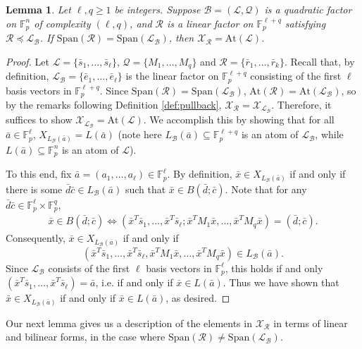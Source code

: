 \documentclass[12pt,oneside,british,a4wide]{amsart}
\newtheorem{lemma}[theorem]{Lemma}
\numberwithin{equation}{section}
\theoremstyle{definition}
\def\F{\mathbb{F}}
\newcommand{\abar}{\bar{a}}
\newcommand{\cbar}{\bar{c}}
\newcommand{\dbar}{\bar{d}}
\newcommand{\ebar}{\bar{e}}
\newcommand{\rbar}{\bar{r}}
\newcommand{\sbar}{\bar{s}}
\newcommand{\xbar}{\bar{x}}
\newcommand{\calL}{\mathcal{L}}
\newcommand{\calB}{\mathcal{B}}
\newcommand{\calQ}{\mathcal{Q}}
\newcommand{\calR}{\mathcal{R}}
\newcommand{\calX}{\mathcal{X}}
\newcommand{\Span}{{\mathrm{Span}}}
\newcommand{\At}{{\mathrm{At}}}
\begin{document}
\begin{lemma}\label{lem:pullback1}
Let $\ell,q\geq 1$ be integers. Suppose $\calB=(\calL,\calQ)$ is a quadratic factor on $\F_p^n$ of complexity $(\ell,q)$, and $\calR $ is a linear factor on $\F_p^{\ell+q}$ satisfying $\calR \preceq\calL_{\calB}$. If $\Span(\calR)=\Span(\calL_{\calB})$, then $\calX_{\calR}=\At(\calL)$.
\end{lemma}
\begin{proof}
Let $\calL=\{\sbar_1,\ldots, \sbar_{\ell}\}$, $\calQ=\{M_1,\ldots, M_q\}$ and $\calR=\{\rbar_1,\ldots, \rbar_k\}$.  Recall that, by definition, $\calL_{\calB}=\{\ebar_1,\ldots, \ebar_{\ell}\}$ is the linear factor on $\F_p^{\ell+q}$ consisting of the first $\ell$ basis vectors in $\F_p^{\ell+q}$.  Since  $\Span(\calR)=\Span(\calL_{\calB})$,  $\At(\calR)=\At(\calL_{\calB})$, so by the remarks following Definition \ref{def:pullback},  $\calX_{\calR}=\calX_{\calL_{\calB}}$.  Therefore, it suffices to show  $\calX_{\calL_{\calB}}=\At(\calL)$. We accomplish this by showing that for all $\abar\in \F_p^{\ell}$, $X_{L_{\calB}(\abar)}=L(\abar)$ (note here $L_{\calB}(\abar)\subseteq \F_p^{\ell+q}$ is an atom of $\calL_{\calB}$, while $L(\abar)\subseteq\F_p^n$ is an atom of $\calL$).

To this end, fix $\abar=(a_1,\ldots, a_{\ell})\in \mathbb{F}_p^{\ell}$. By definition, $\xbar\in X_{L_{\calB}(\abar)}$ if and only if there is some $\dbar\cbar\in L_{\calB}(\abar)$ such that $\xbar\in B(\dbar;\cbar)$.  Note that for any $\dbar\cbar\in \F_p^{\ell}\times \F_p^q$, 
\begin{align*}
\xbar\in B(\dbar;\cbar)\Leftrightarrow(\xbar^T \sbar_1,\ldots, \xbar^T\sbar_{\ell};\xbar^TM_1\xbar, \ldots, \xbar^TM_q\xbar)=(\dbar;\cbar).
\end{align*}
Consequently, $\xbar\in X_{L_{\calB}(\abar)}$ if and only if 
$$
(\xbar^T \sbar_1,\ldots, \xbar^T\sbar_{\ell},\xbar^TM_1\xbar, \ldots, \xbar^TM_q\xbar)\in L_{\calB}(\abar).
$$
Since $\calL_{\calB}$ consists of the first $\ell$ basis vectors in $\F_p^{\ell}$, this holds if and only $(\xbar^T \sbar_1,\ldots, \xbar^T\sbar_{\ell})=\abar$, i.e. if and only if $\xbar\in L(\abar)$.      Thus we have shown that $\xbar\in X_{ L_{\calB}(\abar)}$ if and only if  $\xbar\in L(\abar)$, as desired.  
\end{proof}

Our next  lemma gives us a description of the elements in $\calX_{\calR}$  in terms of linear and bilinear forms, in the case where $\Span(\calR)\neq \Span(\calL_{\calB})$.
\end{document}
